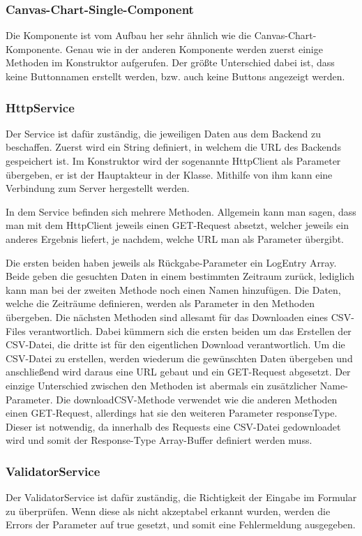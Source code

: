 \subsubsection{Canvas-Chart-Single-Component}
Die Komponente ist vom Aufbau her sehr ähnlich wie die Canvas-Chart-Komponente. Genau wie in der anderen Komponente werden zuerst einige Methoden im Konstruktor aufgerufen. Der größte Unterschied dabei ist, dass keine Buttonnamen erstellt werden, bzw. auch keine Buttons angezeigt werden.
 
\subsubsection{HttpService}
Der Service ist dafür zuständig, die jeweiligen Daten aus dem Backend zu beschaffen. Zuerst wird ein String definiert, in welchem die URL des Backends gespeichert ist. Im Konstruktor wird der sogenannte HttpClient als Parameter übergeben, er ist der Hauptakteur in der Klasse. Mithilfe von ihm kann eine Verbindung zum Server hergestellt werden.
 
In dem Service befinden sich mehrere Methoden. Allgemein kann man sagen, dass man mit dem HttpClient jeweils einen GET-Request absetzt, welcher jeweils ein anderes Ergebnis liefert, je nachdem, welche URL man als Parameter übergibt.
 
Die ersten beiden haben jeweils als Rückgabe-Parameter ein LogEntry Array. Beide geben die gesuchten Daten in einem bestimmten Zeitraum zurück, lediglich kann man bei der zweiten Methode noch einen Namen hinzufügen. Die Daten, welche die Zeiträume definieren, werden als Parameter in den Methoden übergeben. Die nächsten Methoden sind allesamt für das Downloaden eines CSV-Files verantwortlich. Dabei kümmern sich die ersten beiden um das Erstellen der CSV-Datei, die dritte ist für den eigentlichen Download verantwortlich. Um die CSV-Datei zu erstellen, werden wiederum die gewünschten Daten übergeben und anschließend wird daraus eine URL gebaut und ein GET-Request abgesetzt. Der einzige Unterschied zwischen den Methoden ist abermals ein zusätzlicher Name-Parameter. Die downloadCSV-Methode verwendet wie die anderen Methoden einen GET-Request, allerdings hat sie den weiteren Parameter responseType. Dieser ist notwendig, da innerhalb des Requests eine CSV-Datei gedownloadet wird und somit der Response-Type Array-Buffer definiert werden muss.
 
\subsubsection{ValidatorService}
Der ValidatorService ist dafür zuständig, die Richtigkeit der Eingabe im Formular zu überprüfen. Wenn diese als nicht akzeptabel erkannt wurden, werden die Errors der Parameter auf true gesetzt, und somit eine Fehlermeldung ausgegeben.
 
